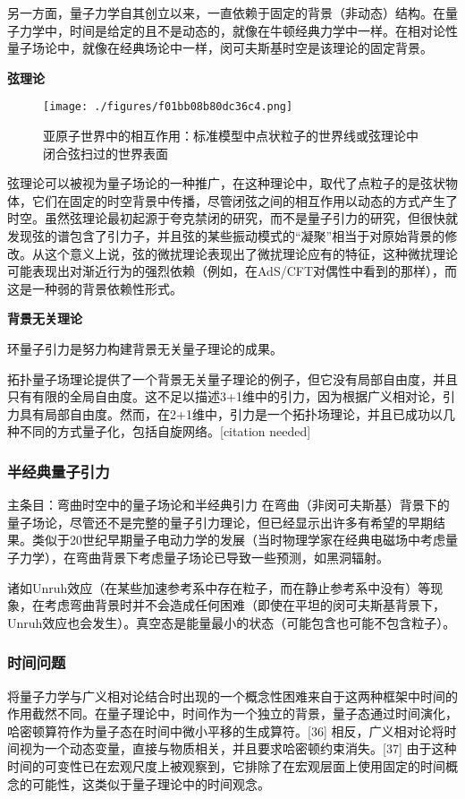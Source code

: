 另一方面，量子力学自其创立以来，一直依赖于固定的背景（非动态）结构。在量子力学中，时间是给定的且不是动态的，就像在牛顿经典力学中一样。在相对论性量子场论中，就像在经典场论中一样，闵可夫斯基时空是该理论的固定背景。

\textbf{弦理论}
\begin{figure}[ht]
\centering
\texttt{[image: ./figures/f01bb08b80dc36c4.png]}
\caption{亚原子世界中的相互作用：标准模型中点状粒子的世界线或弦理论中闭合弦扫过的世界表面} \label{fig_LZYL_4}
\end{figure}
弦理论可以被视为量子场论的一种推广，在这种理论中，取代了点粒子的是弦状物体，它们在固定的时空背景中传播，尽管闭弦之间的相互作用以动态的方式产生了时空。虽然弦理论最初起源于夸克禁闭的研究，而不是量子引力的研究，但很快就发现弦的谱包含了引力子，并且弦的某些振动模式的“凝聚”相当于对原始背景的修改。从这个意义上说，弦的微扰理论表现出了微扰理论应有的特征，这种微扰理论可能表现出对渐近行为的强烈依赖（例如，在AdS/CFT对偶性中看到的那样），而这是一种弱的背景依赖性形式。

\textbf{背景无关理论}  

环量子引力是努力构建背景无关量子理论的成果。

拓扑量子场理论提供了一个背景无关量子理论的例子，但它没有局部自由度，并且只有有限的全局自由度。这不足以描述3+1维中的引力，因为根据广义相对论，引力具有局部自由度。然而，在2+1维中，引力是一个拓扑场理论，并且已成功以几种不同的方式量子化，包括自旋网络。[citation needed]
\subsubsection{半经典量子引力}  
主条目：弯曲时空中的量子场论和半经典引力  
在弯曲（非闵可夫斯基）背景下的量子场论，尽管还不是完整的量子引力理论，但已经显示出许多有希望的早期结果。类似于20世纪早期量子电动力学的发展（当时物理学家在经典电磁场中考虑量子力学），在弯曲背景下考虑量子场论已导致一些预测，如黑洞辐射。

诸如Unruh效应（在某些加速参考系中存在粒子，而在静止参考系中没有）等现象，在考虑弯曲背景时并不会造成任何困难（即使在平坦的闵可夫斯基背景下，Unruh效应也会发生）。真空态是能量最小的状态（可能包含也可能不包含粒子）。
\subsubsection{时间问题 } 
将量子力学与广义相对论结合时出现的一个概念性困难来自于这两种框架中时间的作用截然不同。在量子理论中，时间作为一个独立的背景，量子态通过时间演化，哈密顿算符作为量子态在时间中微小平移的生成算符。[36] 相反，广义相对论将时间视为一个动态变量，直接与物质相关，并且要求哈密顿约束消失。[37] 由于这种时间的可变性已在宏观尺度上被观察到，它排除了在宏观层面上使用固定的时间概念的可能性，这类似于量子理论中的时间观念。
